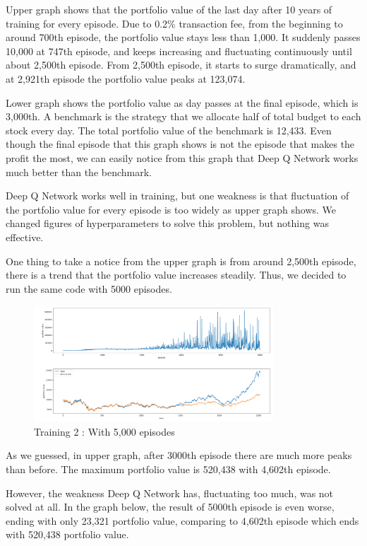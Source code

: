 Upper graph shows that the portfolio value of the last day after 10 years of training for every episode. Due to 0.2\% transaction fee, from the beginning to around 700th episode, the portfolio value stays less than 1,000. It suddenly passes 10,000 at 747th episode, and keeps increasing and  fluctuating continuously until about 2,500th episode. From 2,500th episode, it starts to surge dramatically, and at 2,921th episode the portfolio value peaks at 123,074.  

Lower graph shows the portfolio value as day passes at the final episode, which is 3,000th. A benchmark is the strategy that we allocate half of total budget to each stock every day. The total portfolio value of the benchmark is 12,433. Even though the final episode that this graph shows is not the episode that makes the profit the most, we can easily notice from this graph that Deep Q Network works much better than the benchmark.  

Deep Q Network works well in training, but one weakness is that fluctuation of the portfolio value for every episode is too widely as upper graph shows. We changed figures of hyperparameters to solve this problem, but nothing was effective. 

One thing to take a notice from the upper graph is from around 2,500th episode, there is a trend that the portfolio value increases steadily. Thus, we decided to run the same code with 5000 episodes.

\begin{figure}[H]
\begin{center}
\includegraphics[clip, width=0.8\textwidth]{Graphics/image10.png} \caption{Training 2 : With 5,000 episodes }
\end{center}
\end{figure}

As we guessed, in upper graph, after 3000th episode there are much more peaks than before. The maximum portfolio value is 520,438 with 4,602th episode. 

However, the weakness Deep Q Network has, fluctuating too much, was not solved at all. In the graph below, the result of 5000th episode is even worse, ending with only 23,321 portfolio value, comparing to 4,602th episode which ends with 520,438 portfolio value. 

